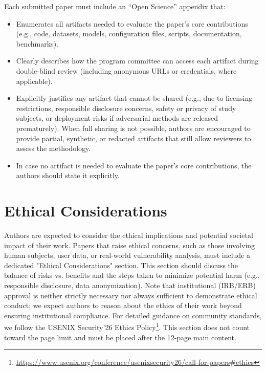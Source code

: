 \documentclass[sigconf]{acmart} %
\begin{document}
Each submitted paper must include an “Open Science” appendix that:
\begin{itemize}
\item Enumerates all artifacts needed to evaluate the paper’s core contributions (e.g., code, datasets, models, configuration files, scripts, documentation, benchmarks).
\item Clearly describes how the program committee can access each artifact during double-blind review (including anonymous URLs or credentials, where applicable).
\item Explicitly justifies any artifact that cannot be shared (e.g., due to licensing restrictions, responsible disclosure concerns, safety or privacy of study subjects, or deployment risks if adversarial methods are released prematurely). When full sharing is not possible, authors are encouraged to provide partial, synthetic, or redacted artifacts that still allow reviewers to assess the methodology.
\item In case no artifact is needed to evaluate the paper’s core contributions, the authors should state it explicitly.
\end{itemize}

\section{Ethical Considerations} %

Authors are expected to consider the ethical implications and potential societal impact of their work. Papers that raise ethical concerns, such as those involving human subjects, user data, or real-world vulnerability analysis, must include a dedicated "Ethical Considerations" section. This section should discuss the balance of risks vs. benefits and the steps taken to minimize potential harm (e.g., responsible disclosure, data anonymization). Note that institutional (IRB/ERB) approval is neither strictly necessary nor always sufficient to demonstrate ethical conduct; we expect authors to reason about the ethics of their work beyond ensuring institutional compliance. For detailed guidance on community standards, we follow the USENIX Security'26 Ethics Policy\footnote{\url{https://www.usenix.org/conference/usenixsecurity26/call-for-papers\#ethics}}. This section does not count toward the page limit and must be placed after the 12-page main content.
\end{document}
